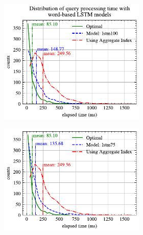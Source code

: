 \begin{figure}[!th]
	\centering
	\begin{subfigure}{0.45\textwidth}
		\begin{subfigure}{\textwidth}
			\centering
%			
			\includegraphics[]{my/graphics/perf_dist_lstm100_A.pdf}
		\end{subfigure}
		\vfill
		\begin{subfigure}{\textwidth}
			\centering
			\includegraphics[]{my/graphics/perf_dist_lstm75_A.pdf}
		\end{subfigure}
		\vfill
		\begin{subfigure}{\textwidth}
			\centering

\end{subfigure}
\end{subfigure}
\end{figure}
